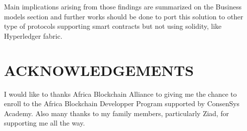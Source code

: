 \documentclass{isprs} %
\begin{document}
Main implications arising from those findings are summarized on the Business models section and further works should be done to port this solution to other type of protocols supporting smart contracts but not using solidity, like Hyperledger fabric.


\section*{ACKNOWLEDGEMENTS}\label{ACKNOWLEDGEMENTS}

I would like to thanks Africa Blockchain Alliance to giving me the chance to enroll to the Africa Blockchain Developper Program supported by ConsenSys Academy. Also many thanks to my family members, particularly Ziad, for supporting me all the way.

{
	\begin{spacing}{1.17}
		\normalsize
	\end{spacing}
}
\end{document}
